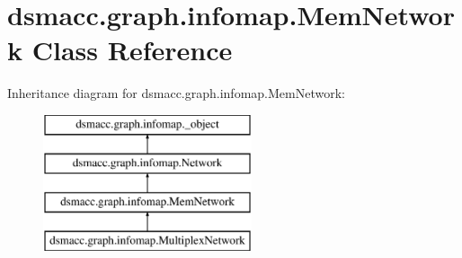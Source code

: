\hypertarget{classdsmacc_1_1graph_1_1infomap_1_1MemNetwork}{}\section{dsmacc.\+graph.\+infomap.\+Mem\+Network Class Reference}
\label{classdsmacc_1_1graph_1_1infomap_1_1MemNetwork}
Inheritance diagram for dsmacc.\+graph.\+infomap.\+Mem\+Network\+:\begin{figure}[H]
\begin{center}
\leavevmode
\includegraphics[height=4.000000cm]{classdsmacc_1_1graph_1_1infomap_1_1MemNetwork}
\end{center}
\end{figure}
